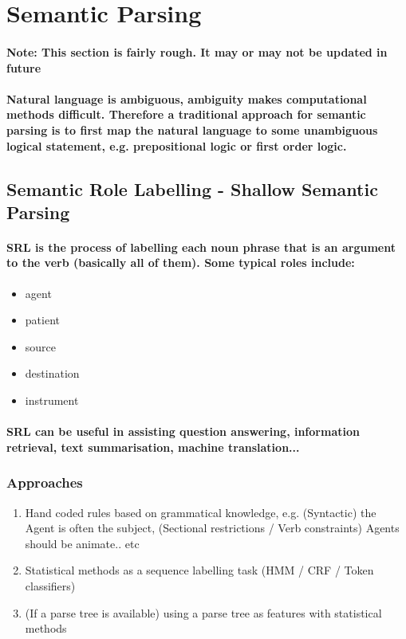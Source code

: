 \documentclass[]{article}
\begin{document}
\section{Semantic Parsing}
\paragraph{Note: This section is fairly rough. It may or may not be updated in future}
\paragraph{Natural language is ambiguous, ambiguity makes computational methods difficult. Therefore a traditional approach for semantic parsing is to first map the natural language to some unambiguous logical statement, e.g. prepositional logic or first order logic.}

\subsection{Semantic Role Labelling - Shallow Semantic Parsing}
\paragraph{SRL is the process of labelling each noun phrase that is an argument to the verb (basically all of them). Some typical roles include:}

\begin{itemize}
	\item agent
	\item patient
	\item source
	\item destination
	\item instrument
\end{itemize}

\paragraph{SRL can be useful in assisting question answering, information retrieval, text summarisation, machine translation...}

\subsubsection{Approaches}
\begin{enumerate}
	\item Hand coded rules based on grammatical knowledge, e.g. (Syntactic) the Agent is often the subject, (Sectional restrictions / Verb constraints) Agents should be animate.. etc
	\item Statistical methods as a sequence labelling task (HMM / CRF / Token classifiers)
	\item (If a parse tree is available) using a parse tree as features with statistical methods
	 
\end{enumerate}
\end{document}
